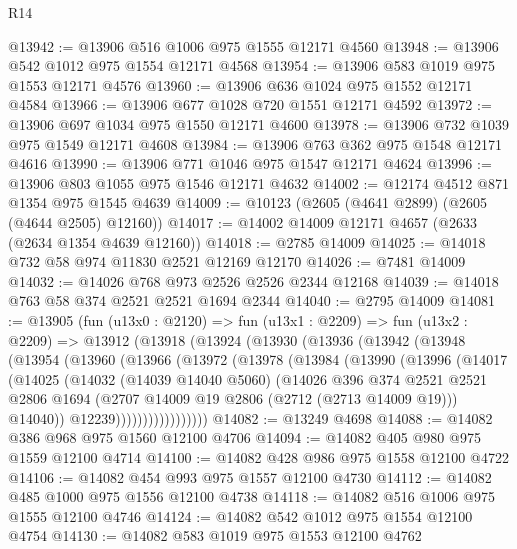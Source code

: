 \begin{lexlean}{R14}
\begin{coremodule}
@13942 := @13906 @516 @1006 @975 @1555 @12171 @4560
@13948 := @13906 @542 @1012 @975 @1554 @12171 @4568
@13954 := @13906 @583 @1019 @975 @1553 @12171 @4576
@13960 := @13906 @636 @1024 @975 @1552 @12171 @4584
@13966 := @13906 @677 @1028 @720 @1551 @12171 @4592
@13972 := @13906 @697 @1034 @975 @1550 @12171 @4600
@13978 := @13906 @732 @1039 @975 @1549 @12171 @4608
@13984 := @13906 @763 @362 @975 @1548 @12171 @4616
@13990 := @13906 @771 @1046 @975 @1547 @12171 @4624
@13996 := @13906 @803 @1055 @975 @1546 @12171 @4632
@14002 := @12174 @4512 @871 @1354 @975 @1545 @4639
@14009 := @10123 (@2605 (@4641 @2899) (@2605 (@4644 @2505) @12160))
@14017 := @14002 @14009 @12171 @4657 (@2633 (@2634 @1354 @4639 @12160))
@14018 := @2785 @14009
@14025 := @14018 @732 @58 @974 @11830 @2521 @12169 @12170
@14026 := @7481 @14009
@14032 := @14026 @768 @973 @2526 @2526 @2344 @12168
@14039 := @14018 @763 @58 @374 @2521 @2521 @1694 @2344
@14040 := @2795 @14009
@14081 := @13905
    (fun (u13x0 : @2120) =>
    fun (u13x1 : @2209) =>
    fun (u13x2 : @2209) =>
    @13912
      (@13918
        (@13924
          (@13930
            (@13936
              (@13942
                (@13948
                  (@13954
                    (@13960
                      (@13966
                        (@13972
                          (@13978
                            (@13984
                              (@13990
                                (@13996
                                  (@14017
                                    (@14025
                                      (@14032
                                        (@14039 @14040 @5060)
                                        (@14026
                                          @396
                                          @374
                                          @2521
                                          @2521
                                          @2806
                                          @1694
                                          (@2707 @14009 @19 @2806 (@2712 (@2713 @14009 @19)))
                                          @14040))
                                      @12239)))))))))))))))))
@14082 := @13249 @4698
@14088 := @14082 @386 @968 @975 @1560 @12100 @4706
@14094 := @14082 @405 @980 @975 @1559 @12100 @4714
@14100 := @14082 @428 @986 @975 @1558 @12100 @4722
@14106 := @14082 @454 @993 @975 @1557 @12100 @4730
@14112 := @14082 @485 @1000 @975 @1556 @12100 @4738
@14118 := @14082 @516 @1006 @975 @1555 @12100 @4746
@14124 := @14082 @542 @1012 @975 @1554 @12100 @4754
@14130 := @14082 @583 @1019 @975 @1553 @12100 @4762

\end{coremodule}
\end{lexlean}
